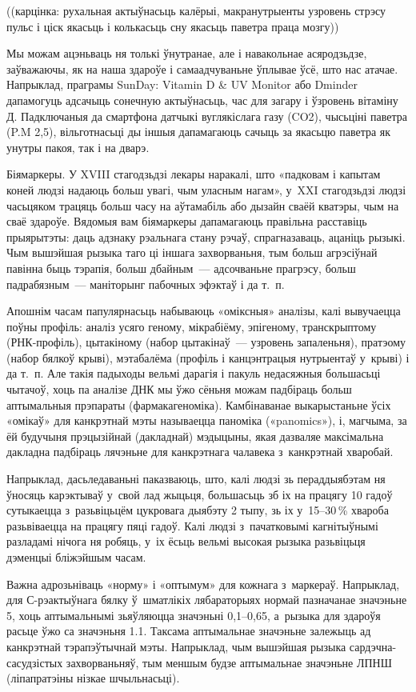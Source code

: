 ((карцінка: рухальная актыўнасьць калёрыі, макранутрыенты узровень стрэсу пульс і ціск якасьць і колькасьць сну якасьць паветра праца мозгу))

Мы можам ацэньваць ня толькі ўнутранае, але і навакольнае асяродзьдзе, заўважаючы, як на наша здароўе і самаадчуваньне ўплывае ўсё, што нас атачае. Напрыклад, праграмы SunDay: Vitamin D \& UV Monitor або Dminder дапамогуць адсачыць сонечную актыўнасьць, час для загару і ўзровень вітаміну Д. Падключаныя да смартфона датчыкі вуглякіслага газу (CO2), чысьціні паветра (P.M 2,5), вільготнасьці ды іншыя дапамагаюць сачыць за якасьцю паветра як унутры пакоя, так і на дварэ.

Біямаркеры. У XVIII стагодзьдзі лекары наракалі, што «падковам і капытам коней людзі надаюць больш увагі, чым уласным нагам», у~XXI стагодзьдзі людзі часьцяком трацяць больш часу на аўтамабіль або дызайн сваёй кватэры, чым на сваё здароўе. Вядомыя вам біямаркеры дапамагаюць правільна расставіць прыярытэты: даць адзнаку рэальнага стану рэчаў, спрагназаваць, ацаніць рызыкі. Чым вышэйшая рызыка таго ці іншага захворваньня, тым больш агрэсіўнай павінна быць тэрапія, больш дбайным~--- адсочваньне прагрэсу, больш падрабязным~--- маніторынг пабочных эфэктаў і да т.~п.

Апошнім часам папулярнасьць набываюць «оміксныя» аналізы, калі вывучаецца поўны профіль: аналіз усяго геному, мікрабіёму, эпігеному, транскрыптому (РНК-профіль), цытакіному (набор цытакінаў~--- узровень запаленьня), пратэому (набор бялкоў крыві), мэтабалёма (профіль і канцэнтрацыя нутрыентаў у~крыві) і да т.~п. Але такія падыходы вельмі дарагія і пакуль недасяжныя большасьці чытачоў, хоць па аналізе ДНК мы ўжо сёньня можам падбіраць больш аптымальныя прэпараты (фармакагеноміка). Камбінаванае выкарыстаньне ўсіх «омікаў» для канкрэтнай мэты называецца паноміка («panomics»), і, магчыма, за ёй будучыня прэцызійнай (дакладнай) мэдыцыны, якая дазваляе максімальна дакладна падбіраць лячэньне для канкрэтнага чалавека з~канкрэтнай хваробай.

Напрыклад, дасьледаваньні паказваюць, што, калі людзі зь пераддыябэтам ня ўносяць карэктываў у~свой лад жыцьця, большасьць зб іх на працягу 10 гадоў сутыкаецца з~разьвіцьцём цукровага дыябэту 2 тыпу, зь іх у~15--30\,\% хвароба разьвіваецца на працягу пяці гадоў. Калі людзі з~пачатковымі кагнітыўнымі разладамі нічога ня робяць, у~іх ёсьць вельмі высокая рызыка разьвіцьця дэменцыі бліжэйшым часам.

Важна адрозьніваць «норму» і «оптымум» для кожнага з~маркераў. Напрыклад, для С-рэактыўнага бялку ў~шматлікіх лябараторыях нормай пазначанае значэньне 5, хоць аптымальнымі зьяўляюцца значэньні 0,1--0,65, а~рызыка для здароўя расьце ўжо са значэньня 1.1. Таксама аптымальнае значэньне залежыць ад канкрэтнай тэрапэўтычнай мэты. Напрыклад, чым вышэйшая рызыка сардэчна-сасудзістых захворваньняў, тым меншым будзе аптымальнае значэньне ЛПНШ (ліпапратэіны нізкае шчыльнасьці).


